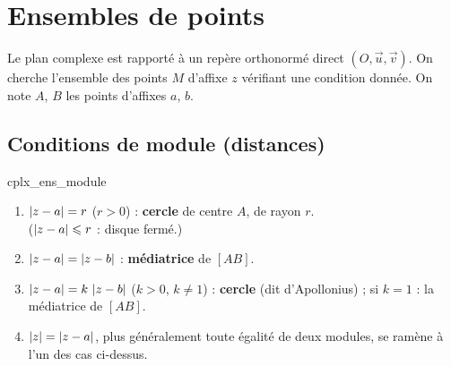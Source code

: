 \section{Ensembles de points}

Le plan complexe est rapporté à un repère orthonormé direct
$(O,\vec u,\vec v)$. On cherche l'ensemble des points $M$ d'affixe $z$
vérifiant une condition donnée. On note $A$, $B$ les points d'affixes $a$, $b$.

\subsection{Conditions de module (distances)}

\begin{propriete}{}{cplx_ens_module}
	\begin{enumerate}
		\item $\left|z - a\right| = r$ \; ($r > 0$) : \textbf{cercle} de centre $A$,
		de rayon $r$. \\ ($\left|z-a\right| \leqslant r$ : disque fermé.)
		\item $\left|z - a\right| = \left|z - b\right|$ : \textbf{médiatrice} de $[AB]$.
		\item $\left|z - a\right| = k\,\left|z - b\right|$ \; ($k > 0$, $k \neq 1$) :
		\textbf{cercle} (dit d'Apollonius) ; si $k = 1$ : la médiatrice de $[AB]$.
		\item $\left|z\right| = \left|z - a\right|$, plus généralement toute égalité de deux
		modules, se ramène à l'un des cas ci-dessus.
	\end{enumerate}
\end{propriete}

\begin{center}
\end{center}

